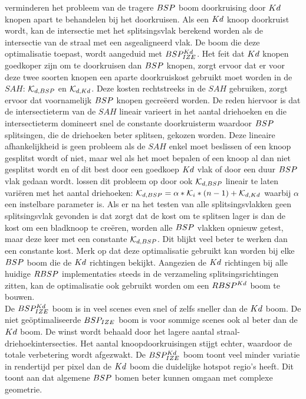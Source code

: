     \authorIze{} \cite{ize} verminderen het probleem van de tragere $BSP$ boom doorkruising door $Kd$ knopen apart te behandelen bij het doorkruisen. 
    Als een $Kd$ knoop doorkruist wordt, kan de intersectie met het splitsingsvlak berekend worden als de intersectie van de straal met een asgealigneerd vlak. 
    De boom die deze optimalisatie toepast, wordt aangeduid met $BSP^{Kd}_{IZE}$.
    Het feit dat $Kd$ knopen goedkoper zijn om te doorkruisen dan $BSP$ knopen, zorgt ervoor dat er voor deze twee soorten knopen een aparte doorkruiskost gebruikt moet worden in de $SAH$: $\mathcal{K}_{d,BSP}$ en $\mathcal{K}_{d,Kd}$.
    Deze kosten rechtstreeks in de $SAH$ gebruiken, zorgt ervoor dat voornamelijk $BSP$ knopen gecreëerd worden.
    De reden hiervoor is dat de intersectieterm van de $SAH$ lineair varieert in het aantal driehoeken en die intersectieterm domineert snel de constante doorkruisterm waardoor $BSP$ splitsingen, die de driehoeken beter splitsen, gekozen worden.
    Deze lineaire afhankelijkheid is geen probleem als de $SAH$ enkel moet beslissen of een knoop gesplitst wordt of niet, maar wel als het moet bepalen of een knoop al dan niet gesplitst wordt en of dit best door een goedkoep $Kd$ vlak of door een duur $BSP$ vlak gedaan wordt.
    \authorIze{} \cite{ize} lossen dit probleem op door ook $\mathcal{K}_{d,BSP}$ lineair te laten variëren met het aantal driehoeken: $\mathcal{K}_{d,BSP} = \alpha * \mathcal{K}_i * (n - 1) + \mathcal{K}_{d,Kd}$ waarbij $\alpha$ een instelbare parameter is.
    Als er na het testen van alle splitsingsvlakken geen splitsingsvlak gevonden is dat zorgt dat de kost om te splitsen lager is dan de kost om een bladknoop te creëren, worden alle $BSP$ vlakken opnieuw getest, maar deze keer met een constante $\mathcal{K}_{d,BSP}$. Dit blijkt veel beter te werken dan een constante kost. Merk op dat deze optimalisatie gebruikt kan worden bij elke $BSP$ boom die de $Kd$ richtingen bekijkt. Aangezien de $Kd$ richtingen bij alle huidige $RBSP$ implementaties steeds in de verzameling splitsingsrichtingen zitten, kan de optimalisatie ook gebruikt worden om een $RBSP^{Kd}$ boom te bouwen.\\
    
    De $BSP^{Kd}_{IZE}$ boom is in veel scenes even snel of zelfs sneller dan de $Kd$ boom.
    De niet geöptimaliseerde $BSP_{IZE}$ boom is voor sommige scenes ook al beter dan de $Kd$ boom. 
    De winst wordt behaald door het lagere aantal straal-driehoekintersecties.
    Het aantal knoopdoorkruisingen stijgt echter, waardoor de totale verbetering wordt afgezwakt. De $BSP^{Kd}_{IZE}$ boom toont veel minder variatie in rendertijd per pixel dan de $Kd$ boom die duidelijke hotspot regio's heeft. Dit toont aan dat algemene $BSP$ bomen beter kunnen omgaan met complexe geometrie.

